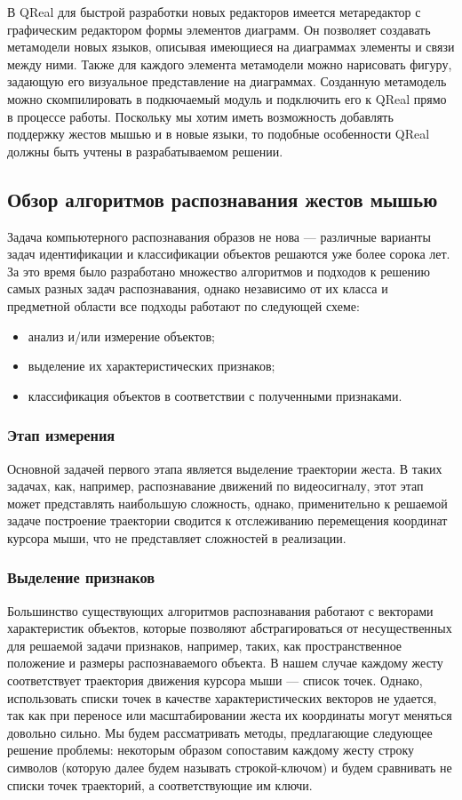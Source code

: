 \documentclass[a5paper]{article}
\begin{document}
В QReal для быстрой разработки новых редакторов имеется метаредактор с графическим редактором формы элементов диаграмм. Он позволяет создавать метамодели новых языков, описывая имеющиеся на диаграммах элементы и связи между ними. Также для каждого элемента метамодели можно нарисовать фигуру, задающую его визуальное представление на диаграммах. Созданную метамодель можно скомпилировать в подкючаемый модуль и подключить его к QReal прямо в процессе работы. Поскольку мы хотим иметь возможность добавлять поддержку  жестов мышью и в новые языки, то подобные особенности QReal должны быть учтены в разрабатываемом решении. 

\subsection{Обзор алгоритмов распознавания жестов мышью}
Задача компьютерного распознавания образов не нова --- различные варианты задач идентификации и классификации объектов решаются уже более сорока лет. За это время было разработано множество алгоритмов и подходов к решению самых разных задач распознавания, однако независимо от их класса и предметной области все подходы работают по следующей схеме: 
\begin{itemize}
  \item анализ и/или измерение объектов;
  \item выделение их характеристических признаков;
  \item классификация объектов в соответствии с полученными признаками.
\end{itemize}

\subsubsection{Этап измерения}
Основной задачей первого этапа является выделение траектории жеста. В таких задачах, как, например, распознавание движений по видеосигналу, этот этап может представлять наибольшую сложность, однако, применительно к решаемой задаче построение траектории сводится к отслеживанию перемещения координат курсора мыши, что не представляет сложностей в реализации. 

\subsubsection{Выделение признаков}
Большинство существующих алгоритмов распознавания работают с векторами характеристик объектов, которые позволяют абстрагироваться от несущественных для решаемой задачи признаков, например, таких, как пространственное положение и размеры распознаваемого объекта. В нашем случае каждому жесту соответствует траектория движения курсора мыши --- список точек. Однако, использовать списки точек в качестве характеристических векторов не удается, так как при переносе или масштабировании жеста их координаты могут меняться довольно сильно. Мы будем рассматривать методы, предлагающие следующее решение проблемы: некоторым образом сопоставим каждому жесту строку символов (которую далее будем называть строкой-ключом) и будем сравнивать не списки точек траекторий, а соответствующие им ключи.
\end{document}
